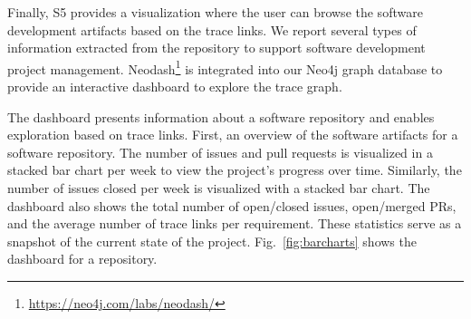 








Finally, \textsf{S5} provides a visualization where the user can browse the software development artifacts based on the trace links. 
We report several types of information extracted from the repository to support software development project management. 
Neodash\footnote{\url{https://neo4j.com/labs/neodash/}} is integrated into our Neo4j graph database to provide an interactive dashboard to explore the trace graph.

The dashboard presents information about a software repository and enables exploration based on trace links.
First, an overview of the software artifacts for a software repository.  
The number of issues and pull requests is visualized in a stacked bar chart per week to view the project's progress over time. 
Similarly, the number of  issues closed per week is visualized with a stacked bar chart. 
The dashboard also shows the total number of open/closed issues, open/merged PRs, and the average number of trace links per requirement. 
These statistics serve as a snapshot of the current state of the project. 
Fig.~\ref{fig:barcharts} shows the dashboard for a repository.

